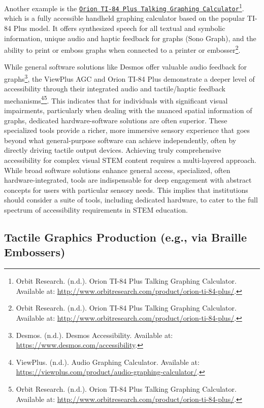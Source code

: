 Another example is the \href{http://www.orbitresearch.com/product/orion-ti-84-plus/}{\texttt{Orion TI-84 Plus Talking Graphing Calculator}}\footnote{Orbit Research. (n.d.). Orion TI-84 Plus Talking Graphing Calculator. Available at: \url{http://www.orbitresearch.com/product/orion-ti-84-plus/}.}. which is a fully accessible handheld graphing calculator based on the popular TI-84 Plus model. It offers synthesized speech for all textual and symbolic information, unique audio and haptic feedback for graphs (Sono Graph), and the ability to print or emboss graphs when connected to a printer or embosser\footnote{Orbit Research. (n.d.). Orion TI-84 Plus Talking Graphing Calculator. Available at: \url{http://www.orbitresearch.com/product/orion-ti-84-plus/}.}.

While general software solutions like Desmos offer valuable audio feedback for graphs\footnote{Desmos. (n.d.). Desmos Accessibility. Available at: \url{https://www.desmos.com/accessibility}.}, the ViewPlus AGC and Orion TI-84 Plus demonstrate a deeper level of accessibility through their integrated audio and tactile/haptic feedback mechanisms\footnote{ViewPlus. (n.d.). Audio Graphing Calculator. Available at: \url{https://viewplus.com/product/audio-graphing-calculator/}.}\footnote{Orbit Research. (n.d.). Orion TI-84 Plus Talking Graphing Calculator. Available at: \url{http://www.orbitresearch.com/product/orion-ti-84-plus/}.}. This indicates that for individuals with significant visual impairments, particularly when dealing with the nuanced spatial information of graphs, dedicated hardware-software solutions are often superior. These specialized tools provide a richer, more immersive sensory experience that goes beyond what general-purpose software can achieve independently, often by directly driving tactile output devices. Achieving truly comprehensive accessibility for complex visual STEM content requires a multi-layered approach. While broad software solutions enhance general access, specialized, often hardware-integrated, tools are indispensable for deep engagement with abstract concepts for users with particular sensory needs. This implies that institutions should consider a suite of tools, including dedicated hardware, to cater to the full spectrum of accessibility requirements in STEM education.

\subsection{Tactile Graphics Production (e.g., via Braille Embossers)}

